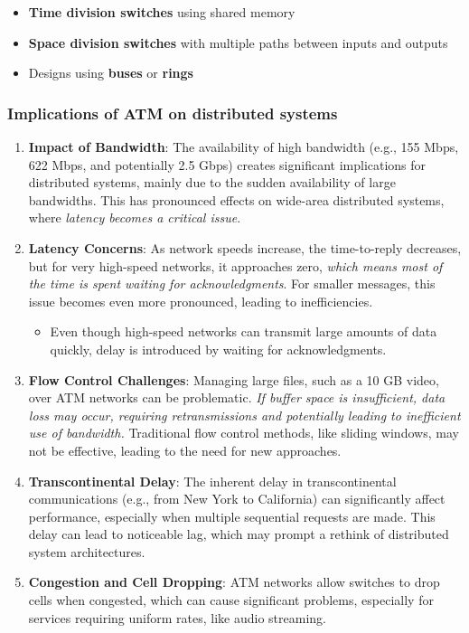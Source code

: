 \documentclass[
]{article}
\providecommand{\tightlist}{%
  \setlength{\itemsep}{0pt}\setlength{\parskip}{0pt}}
\begin{document}
\begin{itemize}
  \begin{itemize}
  \tightlist
  \item
    \textbf{Time division switches} using shared memory
  \item
    \textbf{Space division switches} with multiple paths between inputs
    and outputs
  \item
    Designs using \textbf{buses} or \textbf{rings}
  \end{itemize}
\end{itemize}

\hypertarget{implications-of-atm-on-distributed-systems}{%
\subsubsection{Implications of ATM on distributed
systems}\label{implications-of-atm-on-distributed-systems}}

\begin{enumerate}
\item
  \textbf{Impact of Bandwidth}: The availability of high bandwidth
  (e.g., 155 Mbps, 622 Mbps, and potentially 2.5 Gbps) creates
  significant implications for distributed systems, mainly due to the
  sudden availability of large bandwidths. This has pronounced effects
  on wide-area distributed systems, where \emph{latency becomes a
  critical issue}.
\item
  \textbf{Latency Concerns}: As network speeds increase, the
  time-to-reply decreases, but for very high-speed networks, it
  approaches zero, \emph{which means most of the time is spent waiting
  for acknowledgments}. For smaller messages, this issue becomes even
  more pronounced, leading to inefficiencies.

  \begin{itemize}
  \tightlist
  \item
    Even though high-speed networks can transmit large amounts of data
    quickly, delay is introduced by waiting for acknowledgments.
  \end{itemize}
\item
  \textbf{Flow Control Challenges}: Managing large files, such as a 10
  GB video, over ATM networks can be problematic. \emph{If buffer space
  is insufficient, data loss may occur, requiring retransmissions and
  potentially leading to inefficient use of bandwidth.} Traditional flow
  control methods, like sliding windows, may not be effective, leading
  to the need for new approaches.
\item
  \textbf{Transcontinental Delay}: The inherent delay in
  transcontinental communications (e.g., from New York to California)
  can significantly affect performance, especially when multiple
  sequential requests are made. This delay can lead to noticeable lag,
  which may prompt a rethink of distributed system architectures.
\item
  \textbf{Congestion and Cell Dropping}: ATM networks allow switches to
  drop cells when congested, which can cause significant problems,
  especially for services requiring uniform rates, like audio streaming.
\end{enumerate}
\end{document}
